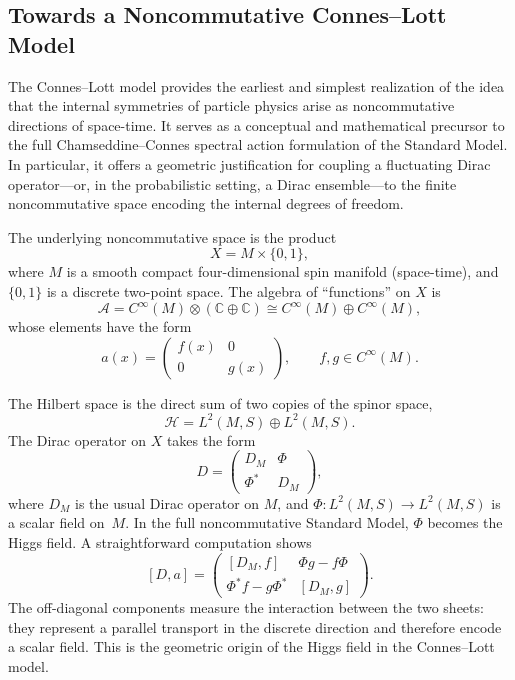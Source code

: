 \documentclass[11pt]{article}
\theoremstyle{plain}
\begin{document}
\subsection{Towards a Noncommutative Connes--Lott Model}

The Connes--Lott model \cite{Connes-Lott, Connes94, QFTNCG} provides the earliest and simplest realization of the idea that the internal symmetries of particle physics arise as noncommutative directions of space-time.  It serves as a conceptual and mathematical precursor to the full Chamseddine--Connes spectral action formulation of the Standard Model.  In particular, it offers a geometric justification for coupling a fluctuating Dirac operator---or, in the probabilistic setting, a Dirac ensemble---to the finite noncommutative space encoding the internal degrees of freedom.




The underlying noncommutative space is the product
\[
X = M \times \{0,1\},
\]
where $M$ is a smooth compact four-dimensional spin manifold (space-time), and $\{0,1\}$ is a discrete two-point space.  The algebra of ``functions'' on $X$ is
\[
\mathcal{A} = C^{\infty}(M) \otimes (\mathbb{C}\oplus\mathbb{C})
           \cong C^{\infty}(M) \oplus C^{\infty}(M),
\]
whose elements have the form
\[
a(x)=
\begin{pmatrix}
f(x) & 0 \\
0 & g(x)
\end{pmatrix},
\qquad f,g\in C^{\infty}(M).
\]

The Hilbert space is the direct sum of two copies of the spinor space,
\[
\mathcal{H}=L^{2}(M,S)\oplus L^{2}(M,S).
\]
The Dirac operator on $X$ takes the form
\[
D =
\begin{pmatrix}
D_{M} & \Phi \\
\Phi^{\ast} & D_{M}
\end{pmatrix},
\]
where $D_{M}$ is the usual Dirac operator on $M$, and $\Phi\colon L^{2}(M,S)\to L^{2}(M,S)$ is a scalar field on~$M$.  In the full noncommutative Standard Model, $\Phi$ becomes the Higgs field.
A straightforward computation shows
\[
[D,a] =
\begin{pmatrix}
[D_{M},f] & \Phi g - f\Phi \\
\Phi^{\ast} f - g\Phi^{\ast} & [D_{M},g]
\end{pmatrix}.
\]
The off-diagonal components measure the interaction between the two sheets: they represent a parallel transport in the discrete direction and therefore encode a scalar field.  This is the geometric origin of the Higgs field in the Connes--Lott model.
\end{document}
